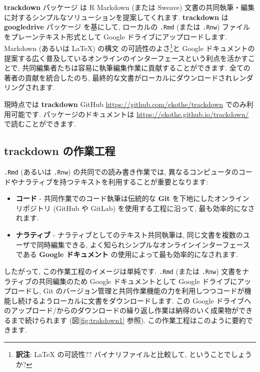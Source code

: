 \documentclass[
  11pt,
  lualatex,ja=standard,jafont=noto]{bxjsreport}
\begin{document}
\textbf{trackdown} パッケージ \autocite{R-trackdown} は R Markdown (または Sweave) 文書の共同執筆・編集に対するシンプルなソリューションを提案してくれます. \textbf{trackdown} は \textbf{googledrive} パッケージ \autocite{R-googledrive} を基にして, ローカルの \texttt{.Rmd} (または \texttt{.Rnw}) ファイルをプレーンテキスト形式として Google ドライブにアップロードします. Markdown (あるいは LaTeX) の構文 の可読性のよさ\footnote{\textbf{訳注}: LaTeX の可読性?? バイナリファイルと比較して, ということでしょうか?}と Google ドキュメントの提案する広く普及しているオンラインのインターフェースという利点を活かすことで, 共同編集者たちは容易に執筆編集作業に貢献することができます. 全ての著者の貢献を統合したのち, 最終的な文書がローカルにダウンロードされレンダリングされます.

現時点では \textbf{trackdown} GitHub \url{https://github.com/ekothe/trackdown} でのみ利用可能です. パッケージのドキュメントは \url{https://ekothe.github.io/trackdown/} で読むことができます.

\hypertarget{trackdown-ux306eux4f5cux696dux5de5ux7a0b}{%
\subsection{trackdown の作業工程}\label{trackdown-ux306eux4f5cux696dux5de5ux7a0b}}

\texttt{.Rmd} (あるいは \texttt{.Rnw}) の共同での読み書き作業では, 異なるコンピュータのコードやナラティブを持つテキストを利用することが重要となります:

\begin{itemize}
\item
  \textbf{コード} - 共同作業でのコード執筆は伝統的な \textbf{Git} を下地にしたオンラインリポジトリ (GitHub や GitLab) を使用する工程に沿って, 最も効率的になされます.
\item
  \textbf{ナラティブ} - ナラティブとしてのテキスト共同執筆は, 同じ文書を複数のユーザで同時編集できる, よく知られシンプルなオンラインインターフェースである \textbf{Google ドキュメント} の使用によって最も効率的になされます.
\end{itemize}

したがって, この作業工程のイメージは単純です. \texttt{.Rmd} (または \texttt{.Rnw}) 文書をナラティブの共同編集のため Google ドキュメントとして Google ドライブにアップロードし, Git のバージョン管理と共同作業機能の力を利用しつつコードが機能し続けるようローカルに文書をダウンロードします. この Google ドライブへのアップロード/からのダウンロードの繰り返し作業は納得のいく成果物ができるまで続けられます (図\ref{fig:trakdown1} 参照). この作業工程はこのように要約できます.
\end{document}

